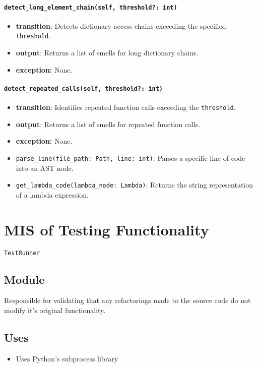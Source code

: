 \documentclass[12pt, titlepage]{article}
\begin{document}
\paragraph{\texttt{detect\_long\_element\_chain(self, threshold?: int)}}
\begin{itemize}
  \item \textbf{transition}: Detects dictionary access chains exceeding the specified \texttt{threshold}.
  \item \textbf{output}: Returns a list of smells for long dictionary chains.
  \item \textbf{exception:} None.
\end{itemize}

\paragraph{\texttt{detect\_repeated\_calls(self, threshold?: int)}}
\begin{itemize}
  \item \textbf{transition}: Identifies repeated function calls exceeding the \texttt{threshold}.
  \item \textbf{output}: Returns a list of smells for repeated function calls.
  \item \textbf{exception:} None.
\end{itemize}
\begin{itemize}
  \item \texttt{parse\_line(file\_path: Path, line: int)}: Parses a specific line of code into an AST node.
  \item \texttt{get\_lambda\_code(lambda\_node: Lambda)}: Returns the string representation of a lambda expression.
\end{itemize}


\newpage

\section{MIS of Testing Functionality} \label{mis:test}

\texttt{TestRunner}

\subsection{Module}

Responsible for validating that any refactorings made to the source code do not modify it's original functionality.

\subsection{Uses}
\begin{itemize}
  \item Uses Python's subprocess library
\end{itemize}
\end{document}
